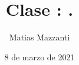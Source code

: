 \documentclass[10pt]{beamer}
\title[Laboratorio de \'Optica y Fluidos.]{Clase : .}
\author[Matias Mazzanti]{Matias Mazzanti}
\institute{Colegio del Salvador}
\date{8 de marzo de 2021}
\begin{document}
\begin{frame}

\maketitle

\end{frame}



\section{}
\begin{frame}
\frametitle{}


\end{frame}



\end{document}
